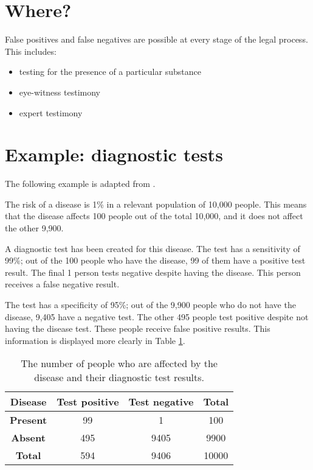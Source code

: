 \documentclass[
]{book}
\providecommand{\tightlist}{%
  \setlength{\itemsep}{0pt}\setlength{\parskip}{0pt}}
\begin{document}
\hypertarget{where}{%
\section{Where?}\label{where}}

False positives and false negatives are possible at every stage of the legal process. This includes:

\begin{itemize}
\tightlist
\item
  testing for the presence of a particular substance
\item
  eye-witness testimony
\item
  expert testimony
\end{itemize}

\hypertarget{exm-test}{%
\section{Example: diagnostic tests}\label{exm-test}}

The following example is adapted from \citet{aitken2010}.

The risk of a disease is 1\% in a relevant population of 10,000 people. This means that the disease affects 100 people out of the total 10,000, and it does not affect the other 9,900.

A diagnostic test has been created for this disease. The test has a sensitivity of 99\%; out of the 100 people who have the disease, 99 of them have a positive test result. The final 1 person tests negative despite having the disease. This person receives a false negative result.

The test has a specificity of 95\%; out of the 9,900 people who do not have the disease, 9,405 have a negative test. The other 495 people test positive despite not having the disease test. These people receive false positive results. This information is displayed more clearly in Table \ref{tab:test-table}.

\begin{table}

\caption{\label{tab:test-table}The number of people who are affected by the disease and their diagnostic test results.}
\centering
\begin{tabular}[t]{cccc}
\toprule
Disease & Test positive & Test negative & Total\\
\midrule
\rowcolor{gray!6}  \textbf{Present} & 99 & 1 & 100\\
\textbf{Absent} & 495 & 9405 & 9900\\
\rowcolor{gray!6}  \textbf{Total} & 594 & 9406 & 10000\\
\bottomrule
\end{tabular}
\end{table}
\end{document}
